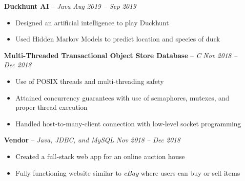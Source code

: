 \documentclass[10pt,letterpaper]{article}
\begin{document}
\spacedhrule{0.3em}{-0.5em}










\headedsection
{\textbf{Duckhunt AI} -- \textit{Java}}
{\textit{Aug 2019 -- Sep 2019}} {
	\begin{itemize}[noitemsep,nolistsep]
		\item Designed an artificial intelligence to play Duckhunt
		\item Used Hidden Markov Models to predict location and species of duck
	\end{itemize}
}



\headedsection
{\textbf{Multi-Threaded Transactional Object Store Database} -- \textit{C}}
{\textit{Nov 2018 -- Dec 2018}} {
	\begin{itemize}[noitemsep,nolistsep]
		\item Use of POSIX threads and multi-threading safety
		\item Attained concurrency guarantees with use of semaphores, mutexes, and proper thread execution
		\item Handled host-to-many-client connection with low-level socket programming
	\end{itemize}
}


\headedsection
{\textbf{Vendor} -- \textit{Java, JDBC, and MySQL}}
{\textit{Nov 2018 -- Dec 2018}} {
	\begin{itemize}[noitemsep,nolistsep]
		\item Created a full-stack web app for an online auction house
		\item Fully functioning website similar to \textit{eBay} where users can buy or sell items
	\end{itemize}
}
\end{document}
